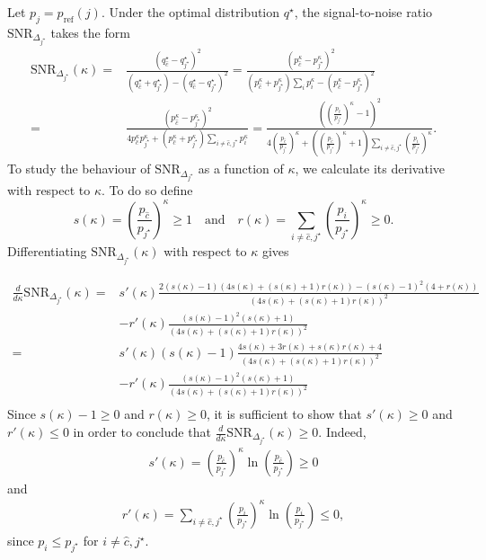 Let $p_j=p_{\text{ref}}(j)$. Under the optimal distribution $q^\star$, the signal-to-noise ratio $\text{SNR}_{\Delta_{j^\star}}$ takes the form
\begin{align*}
    \text{SNR}_{\Delta_{j^\star}}(\kappa) =&\frac{(q_{\hat{c}}^\star- q^\star_{j^\star})^2}{(q^\star_{\hat{c}}+q^\star_{j^\star})-(q_{\hat{c}}^\star- q^\star_{j^\star})^2}
    = \frac{(p_{\hat{c}}^\kappa - p_{j^\star}^\kappa)^2}{(p_{\hat{c}}^\kappa+p_{j^\star}^\kappa)\sum_i p_{i}^\kappa -(p_{\hat{c}}^\kappa - p_{j^\star}^\kappa)^2} \\=& \frac{(p_{\hat{c}}^\kappa - p_{j^\star}^\kappa)^2}{4p_{\hat{c}}^\kappa p_{j^\star}^\kappa + (p_{\hat{c}}^\kappa + p_{j^\star}^\kappa)\sum_{i\neq \hat{c}, j^\star} p_{i}^\kappa}
    = \frac{\left(\left(\tfrac{p_{\hat{c}}}{p_{j^\star}}\right)^\kappa-1\right)^2}{4\left(\tfrac{p_{\hat{c}}}{p_{j^\star}}\right)^\kappa + \left(\left(\tfrac{p_{\hat{c}}}{p_{j^\star}}\right)^\kappa+ 1\right)\sum_{i\neq \hat{c}, j^\star} \left(\tfrac{p_{i}}{p_{j^\star}}\right)^\kappa}.
\end{align*}
To study the behaviour of $\text{SNR}_{\Delta_{j^\star}}$ as a function of $\kappa$, we calculate its derivative with respect to $\kappa$. 
To do so define 
$$s(\kappa) = \left(\frac{p_{\hat{c}}}{p_{j^\star}}\right)^\kappa\geq 1\quad \text{and} \quad r(\kappa) = \sum_{i\neq \hat{c}, j^\star} \left(\frac{p_{i}}{p_{j^\star}}\right)^\kappa\geq 0.$$ Differentiating $\text{SNR}_{\Delta_{j^\star}}(\kappa)$ with respect to $\kappa$ gives

\begin{align*}
    \frac{d}{d\kappa}\text{SNR}_{\Delta_{j^\star}}(\kappa) =& s'(\kappa)\frac{2(s(\kappa)-1)\left(4s(\kappa) + \left(s(\kappa)+ 1\right)r(\kappa)\right)-(s(\kappa)-1)^2(4+r(\kappa))}{\left(4s(\kappa) + \left(s(\kappa)+ 1\right)r(\kappa)\right)^2}\\
    &- r'(\kappa)\frac{(s(\kappa)-1)^2(s(\kappa)+1)}{\left(4s(\kappa) + \left(s(\kappa)+ 1\right)r(\kappa)\right)^2}\\
    =& s'(\kappa)(s(\kappa)-1)\frac{4s(\kappa) + 3r(\kappa)+ s(\kappa)r(\kappa)+4}{\left(4s(\kappa) + \left(s(\kappa)+ 1\right)r(\kappa)\right)^2}\\
    &- r'(\kappa)\frac{(s(\kappa)-1)^2(s(\kappa)+1)}{\left(4s(\kappa) + \left(s(\kappa)+ 1\right)r(\kappa)\right)^2}\\
\end{align*}
Since $s(\kappa)-1 \geq 0$ and $r(\kappa)\geq 0$, it is sufficient to show that $s'(\kappa)\geq 0$ and $r'(\kappa)\leq 0$ in order to conclude that $\frac{d}{d\kappa}\text{SNR}_{\Delta_{j^\star}}(\kappa)\geq 0$.
Indeed,
\begin{align*}
       s'(\kappa) =  \left(\frac{p_{\hat{c}}}{p_{j^\star}}\right)^\kappa \ln  \left(\frac{p_{\hat{c}}}{p_{j^\star}}\right) \geq 0
\end{align*}
and 
\begin{align*}
       r'(\kappa) =  \sum_{i\neq \hat{c}, j^\star}\left(\frac{p_{i}}{p_{j^\star}}\right)^\kappa \ln  \left(\frac{p_{i}}{p_{j^\star}}\right) \leq 0,
\end{align*}
since $p_i\leq p_{j^\star}$ for $i\neq \hat{c}, j^\star$.

